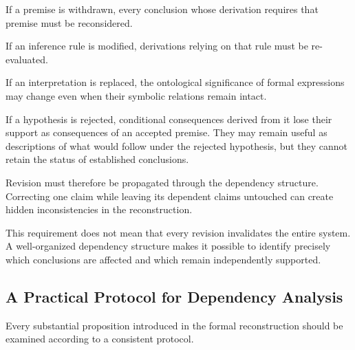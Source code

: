 If a premise is withdrawn, every conclusion whose derivation
requires that premise must be reconsidered.

If an inference rule is modified, derivations relying on that
rule must be re-evaluated.

If an interpretation is replaced, the ontological significance
of formal expressions may change even when their symbolic
relations remain intact.

If a hypothesis is rejected, conditional consequences derived
from it lose their support as consequences of an accepted
premise. They may remain useful as descriptions of what would
follow under the rejected hypothesis, but they cannot retain
the status of established conclusions.

Revision must therefore be propagated through the dependency
structure. Correcting one claim while leaving its dependent
claims untouched can create hidden inconsistencies in the
reconstruction.

This requirement does not mean that every revision invalidates
the entire system. A well-organized dependency structure makes
it possible to identify precisely which conclusions are
affected and which remain independently supported.

\subsection{A Practical Protocol for Dependency Analysis}

Every substantial proposition introduced in the formal
reconstruction should be examined according to a consistent
protocol.

